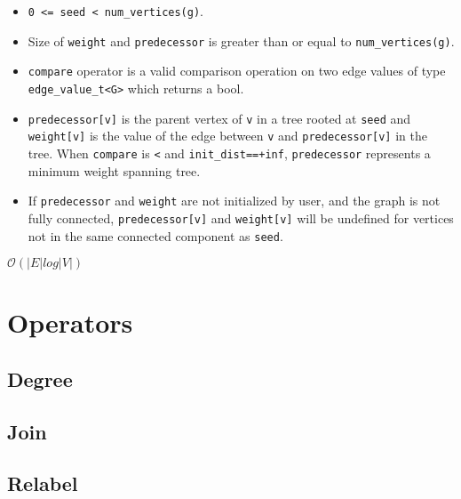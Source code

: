 {\small
      
}
\begin{itemdescr}
      \pnum\preconditions
            \begin{itemize}
                  \item
                        \lstinline{0 <= seed < num_vertices(g)}.
                  \item
                        Size of \lstinline{weight} and \lstinline{predecessor} is greater than or equal to \lstinline{num_vertices(g)}.
                  \item
                        \lstinline{compare} operator is a valid comparison operation on two edge values of type \lstinline{edge_value_t<G>} which returns a bool.
            \end{itemize}
      \pnum\effects
            \begin{itemize}
                  \item
                        \lstinline{predecessor[v]} is the parent vertex of \lstinline{v} in a tree rooted at \lstinline{seed} and \lstinline{weight[v]} is the value of the edge between \lstinline{v} and \lstinline{predecessor[v]} in the tree. When \lstinline{compare} is \lstinline{<} and \lstinline{init_dist==+inf}, \lstinline{predecessor} represents a minimum weight spanning tree.
                  \item
                        If \lstinline{predecessor} and \lstinline{weight} are not initialized by user, and the graph is not fully connected, \lstinline{predecessor[v]} and \lstinline{weight[v]} will be undefined for vertices not in the same connected component as \lstinline{seed}.
            \end{itemize}
      \pnum\complexity $\mathcal{O}(|E|log|V|)$
\end{itemdescr}

\section{Operators}
\subsection{Degree}

\subsection{Join}

\subsection{Relabel}

